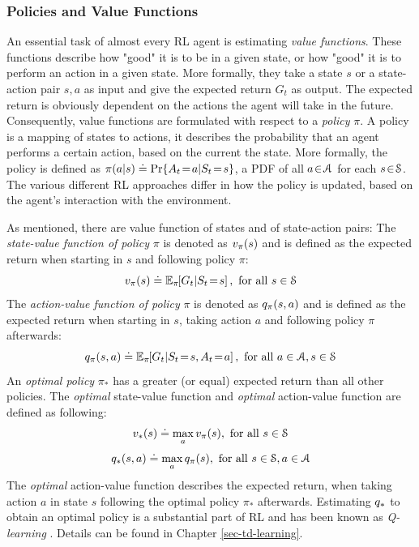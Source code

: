 \documentclass[a4paper, twoside, 12pt]{article}
\let\cite\shortcite
\begin{document}
\subsubsection{Policies and Value Functions}
\label{sec:org98d3312}
An essential task of almost every RL agent is estimating \emph{value functions}.
These functions describe how "good" it is to be in a given state, or how "good"
it is to perform an action in a given state. More formally, they take a state
\(s\) or a state-action pair \(s,a\) as input and give the expected return \(G_t\) as
output. The expected return is obviously dependent on the actions the agent will
take in the future. Consequently, value functions are formulated with respect to
a \emph{policy} \(\pi\). A policy is a mapping of states to actions, it describes the
probability that an agent performs a certain action, based on the current the
state. More formally, the policy is defined as
\(\pi(a|s)\defeq\Pr{A_t\!=\!a|S_t\!=\!s}\), a PDF of all \(a\!\in\!\A\) for each
\(s\!\in\!\S\). The various different RL approaches differ in how the policy is
updated, based on the agent's interaction with the environment.

As mentioned, there are value function of states and of state-action pairs:
The \emph{state-value function of policy} \(\pi\) is denoted as \(\vpi(s)\) and is
defined as the expected return when starting in \(s\) and following policy \(\pi\):
\begin{equation} \label{eq-state-value}
    \vpi(s) \defeq \EE{\pi}{G_t|S_t\!=\!s}, \text{ for all } s\in\S
\end{equation}
The \emph{action-value function of policy} \(\pi\) is denoted as \(\qpi(s,a)\) and is
defined as the expected return when starting in \(s\), taking action \(a\) and
following policy \(\pi\) afterwards:
\begin{equation} \label{eq-action-value}
    \qpi(s,a) \defeq \EE{\pi}{G_t|S_t\!=\!s, A_t\!=\!a}, \text{ for all } a\in\A, s\in\S
\end{equation}
An \emph{optimal policy} \(\pi_*\) has a greater (or equal) expected return than all
other policies.  The \emph{optimal} state-value function and \emph{optimal} action-value
function are defined as following:
\begin{equation}
    \vstar(s) \defeq \max_a \vpi(s), \text{ for all } s\in\S
\end{equation}
\begin{equation}
    \qstar(s,a) \defeq \max_a \qpi(s), \text{ for all } s\in\S, a\in\A
\end{equation}
The \emph{optimal} action-value function describes the expected return, when taking
action \(a\) in state \(s\) following the optimal policy \(\pi_*\) afterwards.
Estimating \(\qstar\) to obtain an optimal policy is a substantial part of RL and
has been known as \emph{Q-learning} \cite{watkins92_q_learn}. Details can be found in
Chapter \ref{sec-td-learning}.
\end{document}
